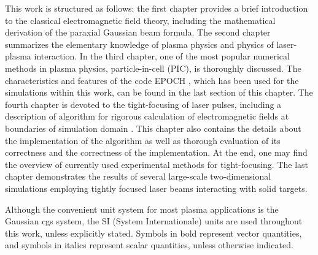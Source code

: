 This work is structured as follows: the first chapter provides a brief introduction to the classical electromagnetic field theory, including the mathematical derivation of the paraxial Gaussian beam formula. The second chapter summarizes the elementary knowledge of plasma physics and physics of laser-plasma interaction. In the third chapter, one of the most popular numerical methods in plasma physics, particle-in-cell (PIC), is thoroughly discussed. The characteristics and features of the code EPOCH \cite{bennett}, which has been used for the simulations within this work, can be found in the last section of this chapter. The fourth chapter is devoted to the tight-focusing of laser pulses, including a description of algorithm for rigorous calculation of electromagnetic fields at boundaries of simulation domain \cite{Thiele2016}. This chapter also contains the details about the implementation of the algorithm as well as thorough evaluation of its correctness and the correctness of the implementation. At the end, one may find the overview of currently used experimental methods for tight-focusing. The last chapter demonstrates the results of several large-scale two-dimensional simulations employing tightly focused laser beams interacting with solid targets.

Although the convenient unit system for most plasma applications is the Gaussian cgs system, the SI (System Internationale) units are used throughout this work, unless explicitly stated. Symbols in bold represent vector quantities, and symbols in italics represent scalar quantities, unless otherwise indicated.

